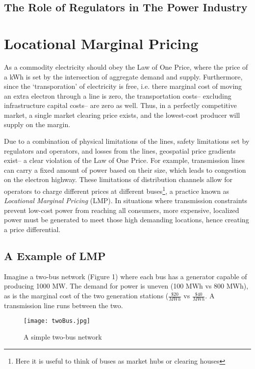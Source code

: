 \documentclass{article}
\begin{document}
\subsection{The Role of Regulators in The Power Industry}


\section{Locational Marginal Pricing}
As a commodity electricity should obey the Law of One Price, where the price of a kWh is set by the intersection of aggregate demand and supply. Furthermore, since the ‘transporation’ of electricity is free, i.e. there marginal cost of moving an extra electron through a line is zero, the transportation costs-- excluding infrastructure capital costs-- are zero as well. Thus, in a perfectly competitive market, a single market clearing price exists, and the lowest-cost producer will supply on the 
margin. \

Due to a combination of physical limitations of the lines, safety limitations set by regulators and operators, and losses from the lines, geospatial price gradients exist-- a clear violation of the Law of One Price. For example, transmission lines can carry a fixed amount of power based on their size, which leads to congestion on the electron highway. These limitations of distribution channels allow for operators to charge different prices at different buses\footnote{Here it is useful to think of buses as market hubs or clearing houses}, a practice known as \emph{Locational Marginal Pricing} (LMP). In situations where transmission constraints prevent low-cost power from reaching all consumers, more expensive, localized power must be generated to meet those high demanding locations, hence creating a price differential.

\subsection{A Example of LMP}
Imagine a two-bus network (Figure 1) where each bus has a generator capable of producing 1000 MW. The demand for power is uneven (100 MWh vs 800 MWh), as is the marginal cost of the two generation stations ($\frac{\$20}{MWh}$ vs $\frac{\$40}{MWh}$. A transmission line runs between the two. 

\begin{figure}[h]
	\texttt{[image: twoBus.jpg]}
	\caption{A simple two-bus network}
\end{figure}
\end{document}
